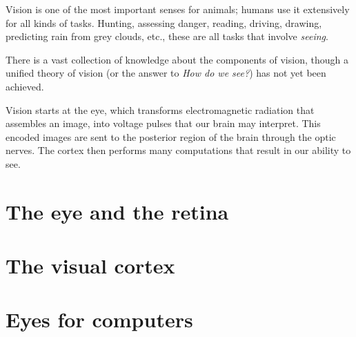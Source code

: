 Vision is one of the most important senses for animals; humans use it extensively for all kinds of tasks. Hunting, assessing danger, reading, driving, drawing, predicting rain from grey clouds, etc., these are all tasks that involve \emph{seeing}. 

There is a vast collection of knowledge about the components of vision, though a unified theory of vision (or the answer to \emph{How do we see?}) has not yet been achieved.

Vision starts at the eye, which transforms electromagnetic radiation that assembles an image, into voltage pulses that our brain may interpret. This encoded images are sent to the posterior region of the brain through the optic nerves. The cortex then performs many computations that result in our ability to see.

\section{The eye and the retina}


\section{The visual cortex}


\section{Eyes for computers}

